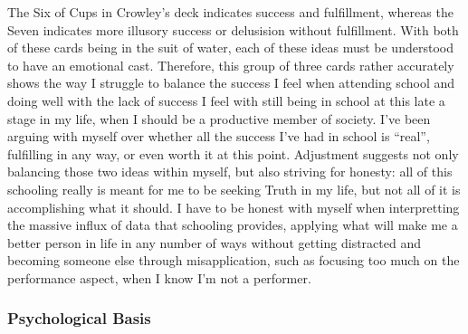 The Six of Cups in Crowley's deck indicates success and fulfillment,
whereas the Seven indicates more illusory success or delusision without
fulfillment.  With both of these cards being in the suit of water, each
of these ideas must be understood to have an emotional cast.  Therefore,
this group of three cards rather accurately shows the way I struggle to
balance the success I feel when attending school and doing well with the
lack of success I feel with still being in school at this late a stage
in my life, when I should be a productive member of society.  I've been
arguing with myself over whether all the success I've had in school is
``real'', fulfilling in any way, or even worth it at this point.
Adjustment suggests not only balancing those two ideas within myself,
but also striving for honesty: all of this schooling really is meant for
me to be seeking Truth in my life, but not all of it is accomplishing
what it should.  I have to be honest with myself when interpretting the
massive influx of data that schooling provides, applying what will make
me a better person in life in any number of ways without getting
distracted and becoming someone else through misapplication, such as
focusing too much on the performance aspect, when I know I'm not a
performer.

\subsubsection*{Psychological Basis}


